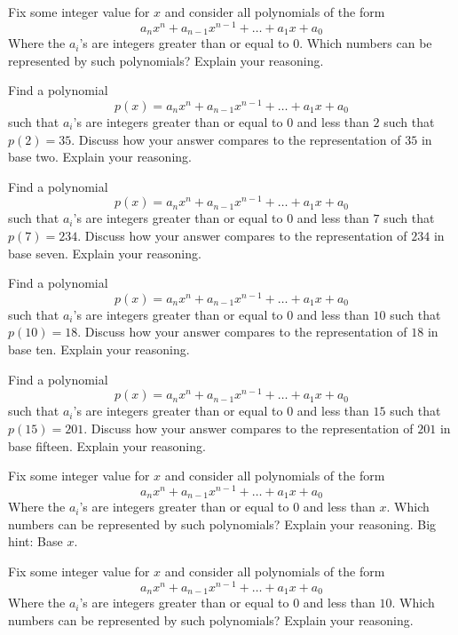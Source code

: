\documentclass[nooutcomes]{ximera}
\begin{document}
\begin{problem}Fix some integer value for $x$ and consider all polynomials of
  the form
\[
a_nx^n + a_{n-1}x^{n-1} + \dots + a_1 x+ a_0
\]
Where the $a_i$'s are integers greater than or equal to $0$. Which
numbers can be represented by such polynomials? Explain your
reasoning.
\end{problem} 

\begin{problem}Find a polynomial 
\[
p(x) = a_nx^n + a_{n-1}x^{n-1} + \dots + a_1 x+ a_0
\]
such that $a_i$'s are integers greater than or equal to $0$ and less
than $2$ such that $p(2) = 35$. Discuss how your answer compares to
the representation of $35$ in base two. Explain your reasoning.
\end{problem} 

\begin{problem}Find a polynomial 
\[
p(x) = a_nx^n + a_{n-1}x^{n-1} + \dots + a_1 x+ a_0
\]
such that $a_i$'s are integers greater than or equal to $0$ and less
than $7$ such that $p(7) = 234$. Discuss how your answer compares to
the representation of $234$ in base seven. Explain your reasoning. 
\end{problem} 

\begin{problem}Find a polynomial 
\[
p(x) = a_nx^n + a_{n-1}x^{n-1} + \dots + a_1 x+ a_0
\]
such that $a_i$'s are integers greater than or equal to $0$ and less
than $10$ such that $p(10) = 18$. Discuss how your answer compares to
the representation of $18$ in base ten. Explain your reasoning.
\end{problem} 

\begin{problem}Find a polynomial 
\[
p(x) = a_nx^n + a_{n-1}x^{n-1} + \dots + a_1 x+ a_0
\]
such that $a_i$'s are integers greater than or equal to $0$ and less
than $15$ such that $p(15) = 201$. Discuss how your answer compares to
the representation of $201$ in base fifteen. Explain your reasoning.
\end{problem} 

\begin{problem}Fix some integer value for $x$ and consider all polynomials of the form
\[
a_nx^n + a_{n-1}x^{n-1} + \dots + a_1 x+ a_0
\]
Where the $a_i$'s are integers greater than or equal to $0$ and less
than $x$. Which numbers can be represented by such polynomials?
Explain your reasoning. Big hint: Base $x$.
\end{problem} 

\begin{problem}Fix some integer value for $x$ and consider all polynomials of
  the form
\[
a_nx^n + a_{n-1}x^{n-1} + \dots + a_1 x+ a_0
\]
Where the $a_i$'s are integers greater than or equal to $0$ and less
than $10$. Which numbers can be represented by such polynomials?
Explain your reasoning.
\end{problem} 
\end{document}
